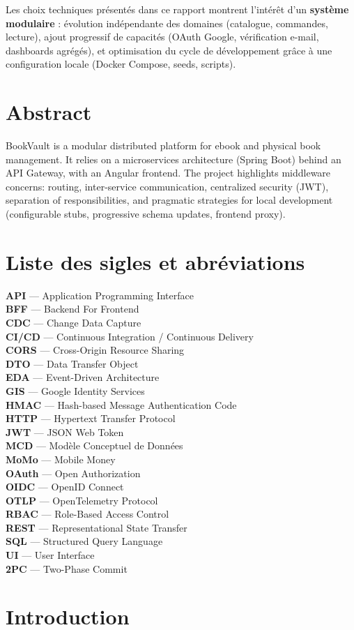 \documentclass[12pt,a4paper]{report}
\newcommand{\sigle}[2]{\textbf{#1} — #2\\}
\begin{document}
Les choix techniques présentés dans ce rapport montrent l'intérêt d'un \textbf{système modulaire} : évolution indépendante des domaines (catalogue, commandes, lecture), ajout progressif de capacités (OAuth Google, vérification e-mail, dashboards agrégés), et optimisation du cycle de développement grâce à une configuration locale (Docker Compose, seeds, scripts).\par

\chapter*{Abstract}
BookVault is a modular distributed platform for ebook and physical book management. It relies on a microservices architecture (Spring Boot) behind an API Gateway, with an Angular frontend. The project highlights middleware concerns: routing, inter-service communication, centralized security (JWT), separation of responsibilities, and pragmatic strategies for local development (configurable stubs, progressive schema updates, frontend proxy).\par

\tableofcontents
\listoffigures
\cleardoublepage

\chapter*{Liste des sigles et abréviations}
\sigle{API}{Application Programming Interface}
\sigle{BFF}{Backend For Frontend}
\sigle{CDC}{Change Data Capture}
\sigle{CI/CD}{Continuous Integration / Continuous Delivery}
\sigle{CORS}{Cross-Origin Resource Sharing}
\sigle{DTO}{Data Transfer Object}
\sigle{EDA}{Event-Driven Architecture}
\sigle{GIS}{Google Identity Services}
\sigle{HMAC}{Hash-based Message Authentication Code}
\sigle{HTTP}{Hypertext Transfer Protocol}
\sigle{JWT}{JSON Web Token}
\sigle{MCD}{Modèle Conceptuel de Données}
\sigle{MoMo}{Mobile Money}
\sigle{OAuth}{Open Authorization}
\sigle{OIDC}{OpenID Connect}
\sigle{OTLP}{OpenTelemetry Protocol}
\sigle{RBAC}{Role-Based Access Control}
\sigle{REST}{Representational State Transfer}
\sigle{SQL}{Structured Query Language}
\sigle{UI}{User Interface}
\sigle{2PC}{Two-Phase Commit}

\cleardoublepage
{}

\chapter{Introduction}
\end{document}
